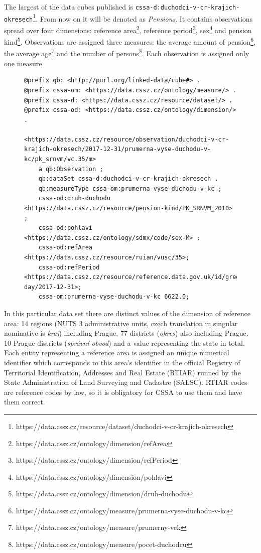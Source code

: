 
The largest of the data cubes published is \verb|cssa-d:duchodci-v-cr-krajich-okresech|\footnote{https://data.cssz.cz/resource/dataset/duchodci-v-cr-krajich-okresech}. From now on it will be denoted as \textit{Pensions}. It contains  observations spread over four dimensions: reference area\footnote{https://data.cssz.cz/ontology/dimension/refArea}, reference period\footnote{https://data.cssz.cz/ontology/dimension/refPeriod}, sex\footnote{https://data.cssz.cz/ontology/dimension/pohlavi} and pension kind\footnote{https://data.cssz.cz/ontology/dimension/druh-duchodu}. Observations are assigned three measures: the average amount of pension\footnote{https://data.cssz.cz/ontology/measure/prumerna-vyse-duchodu-v-kc}, the average age\footnote{https://data.cssz.cz/ontology/measure/prumerny-vek} and the number of persons\footnote{https://data.cssz.cz/ontology/measure/pocet-duchodcu}. Each observation is assigned only one measure.

\begin{figure}[h]
\begin{lstlisting}[language = turtle, caption={Example of an observation from \textit{pensions} data set}, label={cssa1example},captionpos=b escapeinside={(*@}{@*)}]
@prefix qb: <http://purl.org/linked-data/cube#> .
@prefix cssa-om: <https://data.cssz.cz/ontology/measure/> .
@prefix cssa-d: <https://data.cssz.cz/resource/dataset/> .
@prefix cssa-od: <https://data.cssz.cz/ontology/dimension/> .

<https://data.cssz.cz/resource/observation/duchodci-v-cr-krajich-okresech/2017-12-31/prumerna-vyse-duchodu-v-kc/pk_srnvm/vc.35/m>
    a qb:Observation ;
    qb:dataSet cssa-d:duchodci-v-cr-krajich-okresech .
    qb:measureType cssa-om:prumerna-vyse-duchodu-v-kc ;
    cssa-od:druh-duchodu <https://data.cssz.cz/resource/pension-kind/PK_SRNVM_2010> ;
    cssa-od:pohlavi <https://data.cssz.cz/ontology/sdmx/code/sex-M> ;
    cssa-od:refArea <https://data.cssz.cz/resource/ruian/vusc/35>;
    cssa-od:refPeriod <https://data.cssz.cz/resource/reference.data.gov.uk/id/gregorian-day/2017-12-31>;
    cssa-om:prumerna-vyse-duchodu-v-kc 6622.0;
\end{lstlisting}
\end{figure}

In this particular data set there are  distinct values of the dimension of reference area: 14 regions (NUTS 3 administrative units, czech translation in singular nominative is \textit{kraj}) including Prague, 77 districts (\textit{okres}) also including Prague, 10 Prague districts (\textit{správní obvod}) and a value representing the state in total. Each entity representing a reference area is assigned an unique numerical identifier which corresponds to this area's identifier in the official Registry of Territorial Identification, Addresses and Real Estate (RTIAR) runned by the State Administration of Land Surveying and Cadastre (SALSC). RTIAR codes are reference codes by law, so it is obligatory for CSSA to use them and have them correct.

